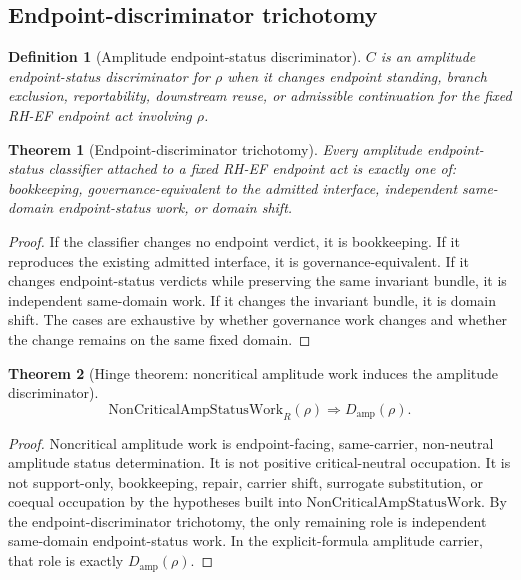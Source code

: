 \documentclass[11pt]{article}
\newtheorem{definition}{Definition}[section]
\newtheorem{theorem}{Theorem}[section]
\newcommand{\NonCritAmpWork}{\mathrm{NonCriticalAmpStatusWork}}
\newcommand{\Damp}{D_{\mathrm{amp}}}
\begin{document}
\subsection{Endpoint-discriminator trichotomy}

\begin{definition}[Amplitude endpoint-status discriminator]
\(C\) is an amplitude endpoint-status discriminator for \(\rho\) when it changes endpoint standing, branch exclusion, reportability, downstream reuse, or admissible continuation for the fixed RH-EF endpoint act involving \(\rho\).
\end{definition}

\begin{theorem}[Endpoint-discriminator trichotomy]
Every amplitude endpoint-status classifier attached to a fixed RH-EF endpoint act is exactly one of: bookkeeping, governance-equivalent to the admitted interface, independent same-domain endpoint-status work, or domain shift.
\end{theorem}

\begin{proof}
If the classifier changes no endpoint verdict, it is bookkeeping.  If it reproduces the existing admitted interface, it is governance-equivalent.  If it changes endpoint-status verdicts while preserving the same invariant bundle, it is independent same-domain work.  If it changes the invariant bundle, it is domain shift.  The cases are exhaustive by whether governance work changes and whether the change remains on the same fixed domain.
\end{proof}

\begin{theorem}[Hinge theorem: noncritical amplitude work induces the amplitude discriminator]
\[
\NonCritAmpWork_R(\rho)\Rightarrow \Damp(\rho).
\]
\end{theorem}

\begin{proof}
Noncritical amplitude work is endpoint-facing, same-carrier, non-neutral amplitude status determination.  It is not positive critical-neutral occupation.  It is not support-only, bookkeeping, repair, carrier shift, surrogate substitution, or coequal occupation by the hypotheses built into \(\NonCritAmpWork\).  By the endpoint-discriminator trichotomy, the only remaining role is independent same-domain endpoint-status work.  In the explicit-formula amplitude carrier, that role is exactly \(\Damp(\rho)\).
\end{proof}
\end{document}
